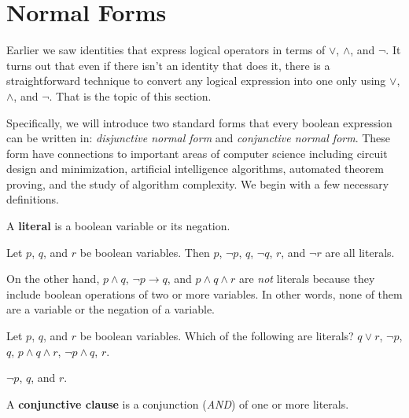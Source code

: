 
\newpage
\section{Normal Forms}\label{section:normal}

Earlier we saw identities that express logical operators
in terms of $\vee$, $\wedge$, and $\neg$.  
It turns out that even if there isn't an identity that does it,
there is a straightforward technique to convert any logical expression
into one only using $\vee$, $\wedge$, and $\neg$.  
That is the topic of this section. 

Specifically, we will introduce two standard forms that every boolean expression can be written in:
{\em disjunctive normal form} and {\em conjunctive normal form}.
These form have connections to important areas of computer science including
circuit design and minimization, artificial intelligence algorithms,
automated theorem proving, and the study of algorithm complexity.
We begin with a few necessary definitions.

\begin{df}
A {\bf literal} is a boolean variable or its negation.
\end{df}

\begin{exa}
Let $p$, $q$, and $r$ be boolean variables.  Then 
$p$, $\neg p$, $q$, $\neg q$, $r$, and $\neg r$ are all literals.

On the other hand, $p\wedge q$, $\neg p \rightarrow q$, and $p\wedge q\wedge r$ 
are {\em not} literals because they include boolean operations of two or more variables.
In other words, none of them are a variable or the negation of a variable.
\end{exa}

\begin{exer}
Let $p$, $q$, and $r$ be boolean variables. 
Which of the following are literals?
$q\vee r$, $\neg p$, $q$, $p\wedge q \wedge r$, $\neg p \wedge q$, $r$.\\
\answerlinetwo 
\begin{answer}
$\neg p$, $q$, and $r$. 
\end{answer}
\end{exer}

\begin{df}
A {\bf conjunctive clause} is a conjunction ({\em AND}) of one or more literals.
\end{df}


